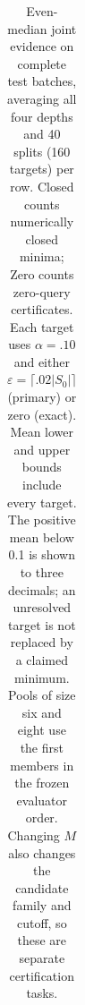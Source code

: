 \begin{table}[t]
\begin{tabular}{lrrlrrrr}
\bottomrule
\end{tabular}
\caption{Even-median joint evidence on complete test batches, averaging all four depths and 40 splits (160 targets) per row. Closed counts numerically closed minima; Zero counts zero-query certificates. Each target uses $\alpha=.10$ and either $\varepsilon=\lceil .02|S_0|\rceil$ (primary) or zero (exact). Mean lower and upper bounds include every target. The positive mean below 0.1 is shown to three decimals; an unresolved target is not replaced by a claimed minimum. Pools of size six and eight use the first members in the frozen evaluator order. Changing $M$ also changes the candidate family and cutoff, so these are separate certification tasks.}
\label{tab:even-median-panels}
\end{table}

